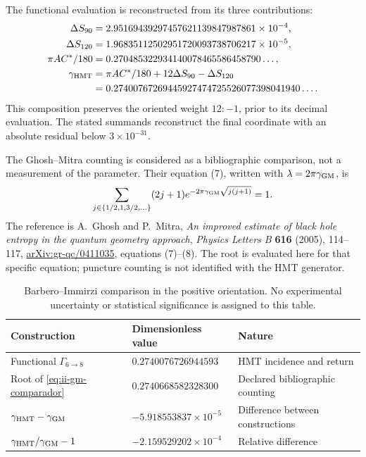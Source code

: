 The functional evaluation is reconstructed from its three contributions:
\begin{align*}
 \Delta S_{90}&=2.95169439297457621139847987861\times10^{-4},\\
 \Delta S_{120}&=1.96835112502951720093738706217\times10^{-5},\\
 \pi AC^*/180&=0.270485322934140078465586458790\ldots,\\
 \gamma_{\rm HMT}&=\pi AC^*/180+12\Delta S_{90}-\Delta S_{120}\\
 &=0.27400767269445927474725526077398041940\ldots.
\end{align*}
This composition preserves the oriented weight \(12:-1\), prior to its
decimal evaluation. The stated summands reconstruct the final
coordinate with an absolute residual below \(3\times10^{-31}\).

The Ghosh--Mitra counting is considered as a bibliographic comparison,
not a measurement of the parameter. Their equation (7), written with
\(\lambda=2\pi\gamma_{\rm GM}\), is
\begin{equation}
 \sum_{j\in\{1/2,1,3/2,\ldots\}}(2j+1)
 e^{-2\pi\gamma_{\rm GM}\sqrt{j(j+1)}}=1.
 \label{eq:ii-gm-comparador}
\end{equation}
The reference is A.~Ghosh and P.~Mitra,
\emph{An improved estimate of black hole entropy in the quantum geometry
approach}, \emph{Physics Letters B} \textbf{616} (2005), 114--117,
\href{https://arxiv.org/abs/gr-qc/0411035}{arXiv:gr-qc/0411035},
equations (7)--(8). The root is evaluated here for that specific equation;
puncture counting is not identified with the HMT generator.

\begin{table}[htbp]
\centering\small
\begin{tabular}{@{}lll@{}}
\toprule
Construction & Dimensionless value & Nature\\
\midrule
Functional \(\Gamma_{6\to8}\) & \(0.2740076726944593\) & HMT incidence and return\\
Root of \eqref{eq:ii-gm-comparador} & \(0.2740668582328300\) & Declared bibliographic counting\\
\midrule
\(\gamma_{\rm HMT}-\gamma_{\rm GM}\) & \(-5.918553837\times10^{-5}\) & Difference between constructions\\
\(\gamma_{\rm HMT}/\gamma_{\rm GM}-1\) & \(-2.159529202\times10^{-4}\) & Relative difference\\
\bottomrule
\end{tabular}
\caption{Barbero--Immirzi comparison in the positive orientation. No
experimental uncertainty or statistical significance is assigned to this table.}
\label{tab:ii-barbero-comparacion}
\end{table}

